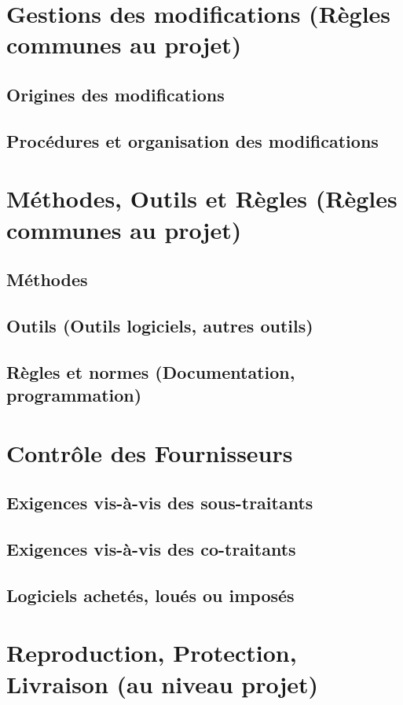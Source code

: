 \documentclass[a4paper]{article}
\begin{document}
\section{Gestions des modifications (Règles communes au projet)}
\subsection{Origines des modifications}
\subsection{Procédures et organisation des modifications}

\section{Méthodes, Outils et Règles (Règles communes au projet)}
\subsection{Méthodes}
\subsection{Outils (Outils logiciels, autres outils)}
\subsection{Règles et normes   (Documentation, programmation)    }

\section{Contrôle des Fournisseurs}
\subsection{Exigences vis-à-vis des sous-traitants}
\subsection{Exigences vis-à-vis des co-traitants}
\subsection{Logiciels achetés, loués ou imposés}

\section{Reproduction, Protection, Livraison (au niveau projet)}
\end{document}
